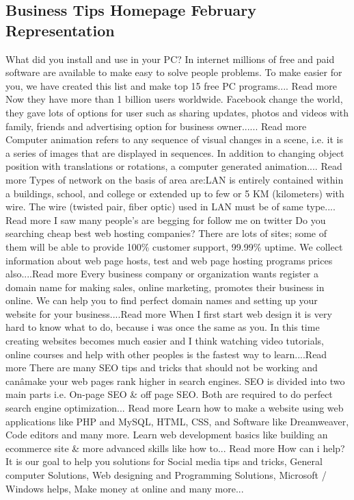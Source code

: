 \documentclass[a4paper,12pt]{article}
\begin{document}
\begin{appendices}
\subsection{Business Tips Homepage February Representation}
What did you install and use in your PC? In internet millions of free and paid software are available to make easy to solve people problems. To make easier for you, we have created this list and make top 15 free PC programs.... Read more
Now they have more than 1 billion users worldwide. Facebook change the world, they gave lots of options for user such as sharing updates, photos and videos with family, friends and advertising option for business owner...... Read more
Computer animation refers to any sequence of visual changes in a scene, i.e. it is a series of images that are displayed in sequences. In addition to changing object position with translations or rotations, a computer generated animation.... Read more
Types of network on the basis of area are:LAN is entirely contained within a buildings, school, and college or extended up to few or 5 KM (kilometers) with wire. The wire (twisted pair, fiber optic) used in LAN must be of same type.... Read more
I saw many people's are begging for follow me on twitter Do you searching cheap best web hosting companies? There are lots of sites; some of them will be able to provide 100\% customer support, 99.99\% uptime. We collect information about web page hosts, test and web page hosting programs prices also....Read more
Every business company or organization wants register a domain name for making sales, online marketing, promotes their business in online. We can help you to find perfect domain names and setting up your website for your business....Read more
When I first start web design it is very hard to know what to do, because i was once the same as you. In this time creating websites becomes much easier and I think watching video tutorials, online courses and help with other peoples is the fastest way to learn....Read more
There are many SEO tips and tricks that should not be working and canâmake your web pages rank higher in search engines. SEO is divided into two main parts i.e. On-page SEO \& off page SEO. Both are required to do perfect search engine optimization... Read more
Learn how to make a website using web applications like PHP and MySQL, HTML, CSS, and Software like Dreamweaver, Code editors and many more. Learn web development basics like building an ecommerce site \& more advanced skills like how to... Read more
How can i help?
It is our goal to help you solutions for Social media tips and tricks, General computer Solutions, Web designing and Programming Solutions, Microsoft / Windows helps, Make money at online and many more...

\end{appendices}
\end{document}
